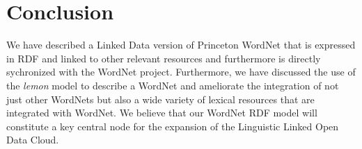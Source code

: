 \documentclass[10pt, a4paper]{article}
\newcommand{\lemon}[0]{\emph{lemon}}
\begin{document}
\section{Conclusion}

We have described a Linked Data version of Princeton WordNet that is expressed in RDF and linked to other relevant resources and furthermore is directly sychronized with the WordNet project.
Furthermore, we have discussed
the use of the \lemon{} model to describe a WordNet and ameliorate the
integration of not just other WordNets but also a wide variety of lexical
resources that are integrated with WordNet. We believe that our WordNet RDF model 
will constitute a key central node for the expansion of the Linguistic
Linked Open Data Cloud.



\end{document}
